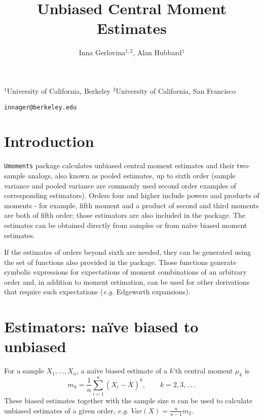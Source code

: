 \documentclass[12pt]{article}
\begin{document}

\title{Unbiased Central Moment Estimates}
\author{Inna Gerlovina$^{1, 2}$, Alan Hubbard$^{1}$}
\maketitle

\begin{scriptsize}
 \noindent $^1$University of California, Berkeley \newline
 \noindent $^2$University of California, San Francisco
\end{scriptsize}
\begin{center}
 {\small \texttt{innager@berkeley.edu}}
\end{center}
\tableofcontents
\newpage

\section{Introduction}

\texttt{Umoments} package calculates unbiased central moment estimates and their two-sample analogs, also known as pooled estimates, up to sixth order (sample variance and pooled variance are commonly used second order examples of corresponding estimators). Orders four and higher include powers and products of moments - for example, fifth moment and a product of second and third moments are both of fifth order; those estimators are also included in the package. The estimates can be obtained directly from samples or from na\"ive biased moment estimates. \par
\vspace{1em}
If the estimates of orders beyond sixth are needed, they can be generated using the set of functions also provided in the package. Those functions generate symbolic expressions for expectations of moment combinations of an arbitrary order and, in addition to moment estimation, can be used for other derivations that require such expectations (\textit{e.g.} Edgeworth expansions).

\section{Estimators: na\"ive biased to unbiased}

For a sample $X_1, \dotsc, X_n$, a na\"ive biased estimate of a $k$'th central moment $\mu_k$ is
\begin{equation}
m_k = \frac{1}{n} \sum_{i = 1}^n (X_i - \bar{X})^k, \qquad k = 2, 3, \dotsc \, .
\end{equation}
These biased estimates together with the sample size $n$ can be used to calculate unbiased estimates of a given order, \textit{e.g.} $Var(X) = \frac{n}{n - 1} m_2$. \par
\vspace{1em}
\end{document}
